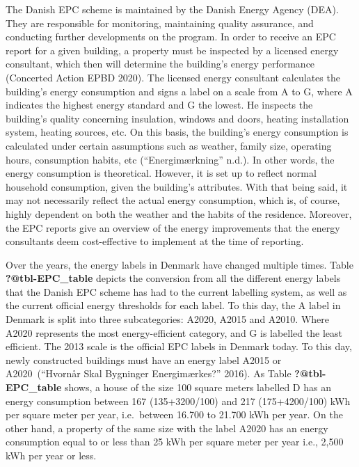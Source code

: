 \documentclass[
  letterpaper,
  DIV=11,
  numbers=noendperiod]{scrreprt}
\begin{document}
The Danish EPC scheme is maintained by the Danish Energy Agency (DEA).
They are responsible for monitoring, maintaining quality assurance, and
conducting further developments on the program. In order to receive an
EPC report for a given building, a property must be inspected by a
licensed energy consultant, which then will determine the building's
energy performance (Concerted Action EPBD 2020). The licensed energy
consultant calculates the building's energy consumption and signs a
label on a scale from A to G, where A indicates the highest energy
standard and G the lowest. He inspects the building's quality concerning
insulation, windows and doors, heating installation system, heating
sources, etc. On this basis, the building's energy consumption is
calculated under certain assumptions such as weather, family size,
operating hours, consumption habits, etc ({``Energimærkning''} n.d.). In
other words, the energy consumption is theoretical. However, it is set
up to reflect normal household consumption, given the building's
attributes. With that being said, it may not necessarily reflect the
actual energy consumption, which is, of course, highly dependent on both
the weather and the habits of the residence. Moreover, the EPC reports
give an overview of the energy improvements that the energy consultants
deem cost-effective to implement at the time of reporting.

Over the years, the energy labels in Denmark have changed multiple
times. Table \textbf{?@tbl-EPC\_table} depicts the conversion from all
the different energy labels that the Danish EPC scheme has had to the
current labelling system, as well as the current official energy
thresholds for each label. To this day, the A label in Denmark is split
into three subcategories: A2020, A2015 and A2010. Where A2020 represents
the most energy-efficient category, and G is labelled the least
efficient. The 2013 scale is the official EPC labels in Denmark today.
To this day, newly constructed buildings must have an energy label A2015
or A2020~({``Hvornår Skal Bygninger Energimærkes?''} 2016). As Table
\textbf{?@tbl-EPC\_table} shows, a house of the size 100 square meters
labelled D has an energy consumption between 167 (135+3200/100) and 217
(175+4200/100) kWh per square meter per year, i.e.~between 16.700 to
21.700 kWh per year. On the other hand, a property of the same size with
the label A2020 has an energy consumption equal to or less than 25 kWh
per square meter per year i.e., 2,500 kWh per year or less.
\end{document}
